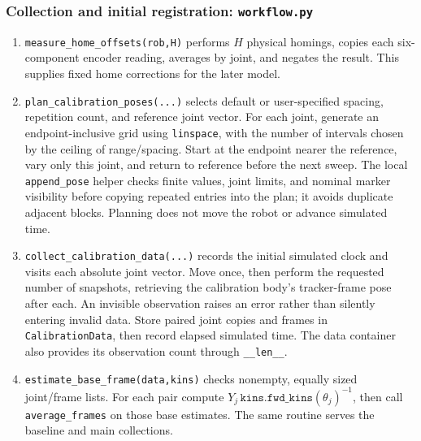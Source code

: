 \documentclass[11pt]{article}
\begin{document}
\subsubsection{Collection and initial registration: \texttt{workflow.py}}
\begin{enumerate}
\setlength{\itemsep}{0pt}
\item \texttt{measure\_home\_offsets(rob,H)} performs $H$ physical homings, copies each six-component encoder reading, averages by joint, and negates the result. This supplies fixed home corrections for the later model.
\item \texttt{plan\_calibration\_poses(...)} selects default or user-specified spacing, repetition count, and reference joint vector. For each joint, generate an endpoint-inclusive grid using \texttt{linspace}, with the number of intervals chosen by the ceiling of range/spacing. Start at the endpoint nearer the reference, vary only this joint, and return to reference before the next sweep. The local \texttt{append\_pose} helper checks finite values, joint limits, and nominal marker visibility before copying repeated entries into the plan; it avoids duplicate adjacent blocks. Planning does not move the robot or advance simulated time.
\item \texttt{collect\_calibration\_data(...)} records the initial simulated clock and visits each absolute joint vector. Move once, then perform the requested number of snapshots, retrieving the calibration body's tracker-frame pose after each. An invisible observation raises an error rather than silently entering invalid data. Store paired joint copies and frames in \texttt{CalibrationData}, then record elapsed simulated time. The data container also provides its observation count through \texttt{\_\_len\_\_}.
\item \texttt{estimate\_base\_frame(data,kins)} checks nonempty, equally sized joint/frame lists. For each pair compute $Y_j\,\texttt{kins.fwd\_kins}(\theta_j)^{-1}$, then call \texttt{average\_frames} on those base estimates. The same routine serves the baseline and main collections.
\end{enumerate}
\end{document}

